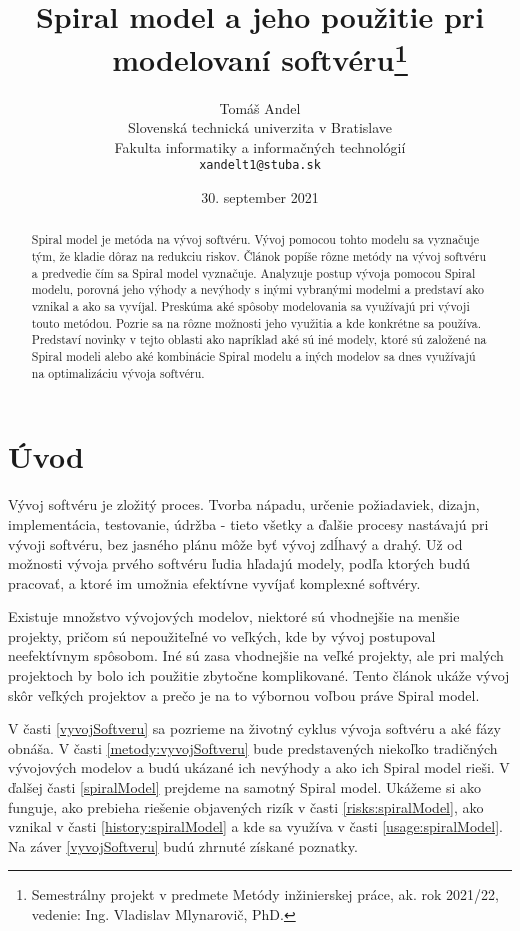 \documentclass[10pt,twoside,slovak,a4paper]{article}
\title{Spiral model a jeho použitie pri modelovaní softvéru\thanks{Semestrálny projekt v predmete Metódy inžinierskej práce, ak. rok 2021/22, vedenie: Ing. Vladislav Mlynarovič, PhD.}}
\author{Tomáš Andel\\[2pt]
	{\small Slovenská technická univerzita v Bratislave}\\
	{\small Fakulta informatiky a informačných technológií}\\
	{\small \texttt{xandelt1@stuba.sk}}
	}
\date{\small 30. september 2021}
\begin{document}
\maketitle

\begin{abstract}
Spiral model je metóda na vývoj softvéru. Vývoj pomocou tohto modelu sa vyznačuje tým, že kladie dôraz na redukciu riskov. Článok popíše rôzne metódy na vývoj softvéru a predvedie čím sa Spiral model vyznačuje. Analyzuje postup vývoja pomocou Spiral modelu, porovná jeho výhody a nevýhody s inými vybranými modelmi a predstaví ako vznikal a ako sa vyvíjal. Preskúma aké spôsoby modelovania sa využívajú pri vývoji touto metódou. Pozrie sa na rôzne možnosti jeho využitia a kde konkrétne sa používa. Predstaví novinky v tejto oblasti ako napríklad aké sú iné modely, ktoré sú založené na Spiral modeli alebo aké kombinácie Spiral modelu a iných modelov sa dnes využívajú na optimalizáciu vývoja softvéru.
\end{abstract}

\section{Úvod}

Vývoj softvéru je zložitý proces. Tvorba nápadu, určenie požiadaviek, dizajn, implementácia, testovanie, údržba - tieto všetky a ďalšie procesy nastávajú pri vývoji softvéru, bez jasného plánu môže byť vývoj zdĺhavý a drahý. Už od možnosti vývoja prvého softvéru ľudia hľadajú modely, podľa ktorých budú pracovať, a ktoré im umožnia efektívne vyvíjať komplexné softvéry.

Existuje množstvo vývojových modelov, niektoré sú vhodnejšie na menšie projekty, pričom sú nepoužiteľné vo veľkých, kde by vývoj postupoval neefektívnym spôsobom. Iné sú zasa vhodnejšie na veľké projekty, ale pri malých projektoch by bolo ich použitie zbytočne komplikované. Tento článok ukáže vývoj skôr veľkých projektov a prečo je na to výbornou voľbou práve Spiral model.

V časti \ref{vyvojSoftveru} sa pozrieme na životný cyklus vývoja softvéru a aké fázy obnáša. V časti \ref{metody:vyvojSoftveru} bude predstavených niekoľko tradičných vývojových modelov a budú ukázané ich nevýhody a ako ich Spiral model rieši. V ďalšej časti \ref{spiralModel} prejdeme na samotný Spiral model. Ukážeme si ako funguje, ako prebieha riešenie objavených rizík v časti \ref{risks:spiralModel}, ako vznikal v časti \ref{history:spiralModel} a kde sa využíva v časti \ref{usage:spiralModel}. Na záver \ref{vyvojSoftveru} budú zhrnuté získané poznatky.
\end{document}
